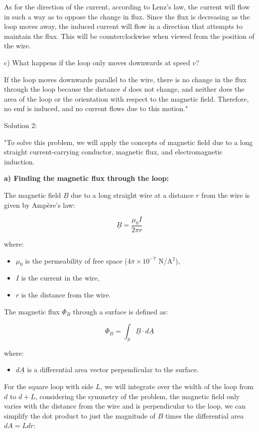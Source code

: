 As for the direction of the current, according to Lenz's law, the current will flow in such a way as to oppose the change in flux. Since the flux is decreasing as the loop moves away, the induced current will flow in a direction that attempts to maintain the flux. This will be counterclockwise when viewed from the position of the wire.

c) What happens if the loop only moves downwards at speed \( v \)?

If the loop moves downwards parallel to the wire, there is no change in the flux through the loop because the distance \( d \) does not change, and neither does the area of the loop or the orientation with respect to the magnetic field. Therefore, no emf is induced, and no current flows due to this motion."

Solution 2:

"To solve this problem, we will apply the concepts of magnetic field due to a long straight current-carrying conductor, magnetic flux, and electromagnetic induction.

\textbf{a) Finding the magnetic flux through the loop:}

The magnetic field $\underline{B}$ due to a long straight wire at a distance $r$ from the wire is given by Ampère's law:

\[
\underline{B} = \frac{\mu_0 I}{2\pi r}
\]

where:
\begin{itemize}
    \item $\mu_0$ is the permeability of free space ($4\pi \times 10^{-7}$ N/A$^2$),
    \item $I$ is the current in the wire,
    \item $r$ is the distance from the wire.
\end{itemize}

The magnetic flux $\Phi_B$ through a surface is defined as:

\[
\Phi_B = \int_S \underline{B} \cdot d\underline{A}
\]

where:
\begin{itemize}
    \item $d\underline{A}$ is a differential area vector perpendicular to the surface.
\end{itemize}

For the square loop with side $L$, we will integrate over the width of the loop from $d$ to $d+L$, considering the symmetry of the problem, the magnetic field only varies with the distance from the wire and is perpendicular to the loop, we can simplify the dot product to just the magnitude of $B$ times the differential area $dA = L dr$:

